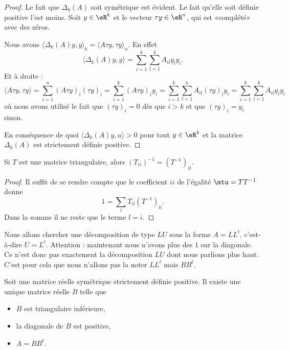 \begin{proof}
	Le fait que \( \Delta_k(A)\) soit symétrique est évident. Le fait qu'elle soit définie positive l'est moins. Soit \( y\in \eR^k\) et le vecteur \( \tau y\in \eR^n\), qui est «complété» avec des zéros.

	Nous avons \( \langle \Delta_k(A)y, y\rangle_k=\langle A\tau y, \tau y \rangle_n\). En effet
	\begin{equation}
		\langle \Delta_k(A)y, y\rangle =\sum_{i=1}^k\sum_{l=1}^kA_{il}y_ly_i.
	\end{equation}
	Et à droite :
	\begin{equation}
		\langle A\tau y, \tau y\rangle =\sum_{i=1}^n(A\tau y)_i(\tau y)_i
		=\sum_{i=1}^k(A\tau y)_i y_i
		=\sum_{i=1}^k\sum_{l=1}^n A_{il}(\tau y)_ly_i
		=\sum_{i=1}^k\sum_{l=1}^k A_{il}y_ly_i
	\end{equation}
	où nous avons utilisé le fait que \( (\tau y)_i=0\) dès que \( i>k\) et que \( (\tau y)_i=y_i\) sinon.

	En conséquence de quoi \( \langle \Delta_k(A)y, u\rangle >0\) pour tout \( y\in \eR^k\) et la matrice \( \Delta_k(A)\) est strictement définie positive.
\end{proof}

\begin{lemma}       \label{LEMooLBQLooIYvacH}
	Si \( T\) est une matrice triangulaire, alors \( (T_{ii})^{-1}=(T^{-1})_{ii}\).
\end{lemma}

\begin{proof}
	Il suffit de se rendre compte que le coefficient \( ii\) de l'égalité \( \mtu=TT^{-1}\) donne
	\begin{equation}
		1=\sum_lT_{il}(T^{-1})_{li}.
	\end{equation}
	Dans la somme il ne reste que le terme \( l=i\).
\end{proof}

Nous allons chercher une décomposition de type \( LU\) sous la forme \( A=LL^t\), c'est-à-dire \( U=L^t\). Attention : maintenant nous n'avons plus des \( 1\) sur la diagonale. Ce n'est donc pas exactement la décomposition \( LU\) dont nous parlions plus haut. C'est pour cela que nous n'allons pas la noter \( LL^t\) mais \( BB^t\).

\begin{theorem}
	Soit une matrice réelle symétrique strictement définie positive. Il existe une unique matrice réelle \( B\) telle que
	\begin{itemize}
		\item \( B\) est triangulaire inférieure,
		\item la diagonale de \( B\) est positive,
		\item \( A=BB^t\).
	\end{itemize}
\end{theorem}

